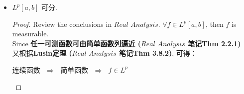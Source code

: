 \begin{example}
\begin{itemize}
\begin{itemize}
\begin{proof}
\begin{itemize}
						\item $A \subset l^p$ 即为$(l^p , \rho_p)$ 的可数稠密子集： \\
						$\forall \{ x_n \}_{n = 1}^{\infty} \in l^p$. Since 
						\[ \sum_{n = 1}^{\infty}{\left| x_n \right|^p} < \infty \]
						Then for $\forall \epsilon > 0$, $\exists N \in \N$, $\st$
						\[ \sum_{n = N + 1}^{\infty}{\left| x_n \right|^p} < \dfrac{\epsilon}{2} \]
						Thus $\exists \{ y_n \}_{n = 1}^{\infty} \in A_N \subset A$, $y_n = 0$, $\forall n > N$ and
						\[ \left| y_n - x_n \right|^p < \dfrac{\epsilon}{2N} , \,\, \forall 1 \leq n \leq N \]
						Therefore
						\[ \rho_p(\{ x_n \}_{n = 1}^{\infty} , \{ y_n \}_{n = 1}^{\infty}) 
						= \sum_{n = 1}^{\infty}{\left| x_n - y_n \right|^p} 
						< \epsilon \]
						$A \subset l^p$ is dense in $l^p$ while it's also countable.
					\end{itemize}
				\end{proof}
			\end{itemize}
			
			\newpage
			
			\item $L^{p}[a , b]$ 可分. 
			\begin{proof}
				Review the conclusions in $Real \,\, Analysis$. $\forall f \in L^{p}[a , b]$, then $f$ is measurable.\\
				Since \textbf{任一可测函数可由简单函数列逼近 ($Real \,\, Analysis$ 笔记Thm 2.2.1)} \\
				又根据\textbf{Lusin定理 ($Real \,\, Analysis$ 笔记Thm 3.8.2)}, 可得：
				\begin{center}
					连续函数 $\,\, \Rightarrow \,\,$ 简单函数 $\,\, \Rightarrow \,\,$ $f \in L^p$
				\end{center}
			\end{proof}
			
			\vspace*{2em}
			

\end{itemize}
\end{example}
